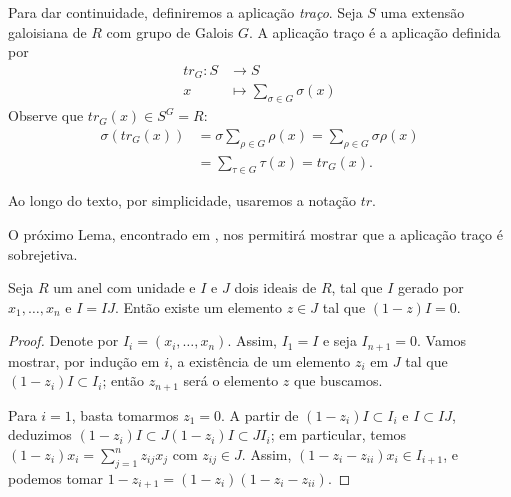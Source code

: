 Para dar continuidade, definiremos a aplicação \emph{traço}\label{def:traco}. Seja $S$ uma extensão galoisiana de $R$ com grupo de Galois $G$. A aplicação traço é a aplicação definida por 
\begin{align*}
    tr_G : S &\rightarrow S \\
    x &\mapsto \sum_{\sigma\in G} \sigma(x)
\end{align*}
Observe que $tr_G(x) \in S^G=R$:
\begin{align*}
    \sigma(tr_G(x)) & = \sigma \sum_{\rho \in G} \rho(x) = \sum_{\rho \in G} \sigma \rho (x) \\
    & = \sum_{\tau \in G} \tau (x) = tr_G(x).
\end{align*}

Ao longo do texto, por simplicidade, usaremos a notação $tr$. \par 
O próximo Lema, encontrado em \cite{zariski}, nos permitirá mostrar que a aplicação traço é sobrejetiva.

\begin{lemma} \label{lem:zariski}
Seja $R$ um anel com unidade e $I$ e $J$ dois ideais de $R$, tal que $I$ gerado por $x_1, \dots, x_n$ e $I =IJ$. Então existe um elemento $z \in J$ tal que $(1-z)I=0$. 
\begin{proof}
Denote por $I_i = (x_i, \dots, x_n)$. Assim, $I_1 =I$ e seja $I_{n+1}=0$. Vamos mostrar, por indução em $i$, a existência de um elemento $z_i$ em $J$ tal que $(1-z_i)I\subset I_i$; então $z_{n+1}$ será o elemento $z$ que buscamos. \par
Para $i=1$, basta tomarmos $z_1=0$. A partir de $(1-z_i)I\subset I_i$ e $I\subset IJ$, deduzimos $(1-z_i)I\subset J(1-z_i)I \subset JI_i$; em particular, temos $(1-z_i)x_i = \sum_{j=1}^{n}z_{ij}x_j$ com $z_{ij}\in J$. Assim, $(1-z_i - z_{ii})x_i \in I_{i+1}$, e podemos tomar $1-z_{i+1} = (1-z_i)(1-z_i-z_{ii})$.
\end{proof}
\end{lemma}

